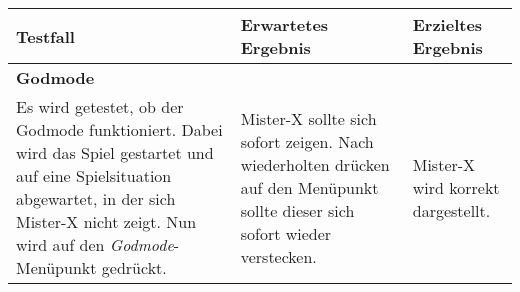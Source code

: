     \begin{table}[H]
        \caption{Einstellungs Tests}
        \begin{longtable}{p{6cm} p{4cm} p{2cm}} 
            \hline
            \textbf{Testfall} & \textbf{Erwartetes Ergebnis} & \textbf{Erzieltes Ergebnis}\\
            \hline
            \endfirsthead
            \textbf{Godmode}\\
            Es wird getestet, ob der Godmode funktioniert.
            Dabei wird das Spiel gestartet und auf eine Spielsituation abgewartet, in der sich Mister-X nicht zeigt.
            Nun wird auf den \textit{Godmode}-Menüpunkt gedrückt.
            &
            Mister-X sollte sich sofort zeigen. Nach wiederholten drücken auf den Menüpunkt sollte dieser sich sofort wieder verstecken.
            &
            Mister-X wird korrekt dargestellt.
            \\
            \hline
        \end{longtable}
    \end{table}

